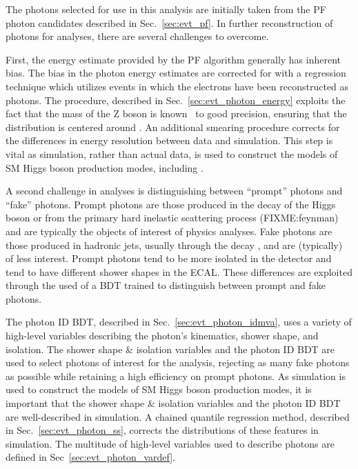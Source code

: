 The photons selected for use in this analysis are initially taken from the PF photon candidates described in Sec.~\ref{sec:evt_pf}.
In further reconstruction of photons for \Hgg analyses, there are several challenges to overcome.

First, the energy estimate provided by the PF algorithm generally has inherent bias.
The bias in the photon energy estimates are corrected for with a regression technique which utilizes \Zee events in which the electrons have been reconstructed as photons.
The procedure, described in Sec.~\ref{sec:evt_photon_energy} exploits the fact that the mass of the Z boson is known~\cite{Tanabashi:2018oca} to good precision, ensuring that the \mee distribution is centered around \mZ.
An additional smearing procedure corrects for the differences in energy resolution between data and simulation.
This step is vital as simulation, rather than actual data, is used to construct the models of SM Higgs boson production modes, including \ttH.

A second challenge in \Hgg analyses is distinguishing between ``prompt'' photons and ``fake'' photons.
Prompt photons are those produced in the decay of the Higgs boson or from the primary hard inelastic scattering process (FIXME:feynman) and are typically the objects of interest of physics analyses.
Fake photons are those produced in hadronic jets, usually through the decay \Pigg, and are (typically) of less interest.
Prompt photons tend to be more isolated in the detector and tend to have different shower shapes in the ECAL.
These differences are exploited through the used of a BDT trained to distinguish between prompt and fake photons.

The photon ID BDT, described in Sec.~\ref{sec:evt_photon_idmva}, uses a variety of high-level variables describing the photon's kinematics, shower shape, and isolation.
The shower shape \& isolation variables and the photon ID BDT are used to select photons of interest for the \ttH analysis, rejecting as many fake photons as possible while retaining a high efficiency on prompt photons.
As simulation is used to construct the models of SM Higgs boson production modes, it is important that the shower shape \& isolation variables and the photon ID BDT are well-described in simulation.
A chained quantile regression method, described in Sec.~\ref{sec:evt_photon_ss}, corrects the distributions of these features in simulation.
The multitude of high-level variables used to describe photons are defined in Sec~\ref{sec:evt_photon_vardef}.
 
